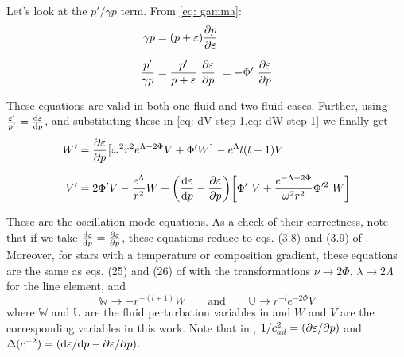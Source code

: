 \documentclass[a4paper,12pt,onehalfspacing]{report}
\begin{document}
Let's look at the $p'/\gamma p$ term. From \cref{eq: gamma}:
\begin{align*}
    \gamma p &= \qty(p+\varepsilon)\pdv{p}{\varepsilon}\\[1.5ex]
    \frac{p'}{\gamma p}&= \frac{p'}{p+\varepsilon}\ \pdv{\varepsilon}{p}\ = -\Phi'\ \pdv{\varepsilon}{p}
\end{align*}

These equations are valid in both one-fluid and two-fluid cases. Further, using $\frac{\varepsilon'}{p'}= \dv{\varepsilon}{p}$, and substituting these in \cref{eq: dV step 1,eq: dW step 1} we finally get
\begin{align}
    W'&= \pdv{\varepsilon}{p}\qty[\omega^2 r^2e^{\Lambda-2\Phi} V+\Phi'W]- e^\Lambda l(l+1)V\label{eq: dW}\\[1.5ex]
    V'&= 2\Phi'V-\frac{e^{\Lambda}}{r^2}{W}+\qty(\dv{\varepsilon}{p}-\pdv{\varepsilon}{p})\qty[\Phi'\ V+\frac{e^{-\Lambda+2\Phi}}{\omega^2 r^2}{\Phi'^2}\ W]\label{eq: dV}
\end{align}

These are the oscillation mode equations. As a check of their correctness, note that if we take $\dv{\varepsilon}{p}= \pdv{\varepsilon}{p}$, these equations reduce to eqs. (3.8) and (3.9) of \cite{Sotani}. Moreover, for stars with a temperature or composition gradient, these equations are the same as eqs. (25) and (26) of \cite{Zhao_Jaik_quasinormal_g} with the transformations $\nu\to2\Phi$, $\lambda\to 2\Lambda$ for the line element, and
\begin{equation*}
    \mathbb{W}\to -r^{-(l+1)}W\qquad \text{and}\qquad \mathbb{U}\to r^{-l} e^{-2\Phi} V
\end{equation*}
where $\mathbb{W}$ and $\mathbb{U}$ are the fluid perturbation variables in \cite{Zhao_Jaik_quasinormal_g} and $W$ and $V$ are the corresponding variables in this work. Note that in \cite{Zhao_Jaik_quasinormal_g}, $1/c_{ad}^2= \qty(\partial \varepsilon/\partial p)$ and $\Delta(c^{-2})= \qty(\dd \varepsilon/\dd p-\partial \varepsilon/\partial p)$.
\end{document}
